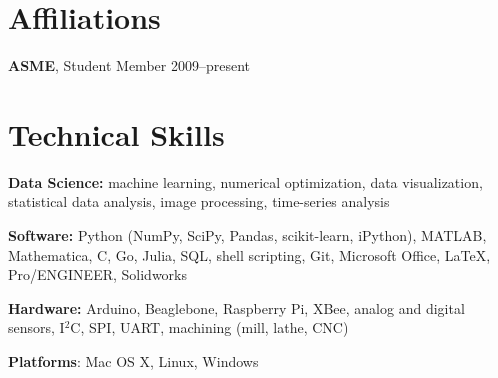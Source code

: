 \documentclass[]{res}
\begin{document}
\begin{resume}
\section{Affiliations}
\vspace{0.1in}

\textbf{ASME}, Student Member \hfill 2009--present


\section{Technical Skills}
\vspace{0.1in}

\textbf{Data Science:} machine learning, numerical optimization, data
visualization, statistical data analysis, image processing, time-series
analysis

\textbf{Software:} Python (NumPy, SciPy, Pandas, scikit-learn, iPython),
MATLAB, Mathematica, C, Go, Julia, SQL, shell scripting, Git, Microsoft Office,
LaTeX, Pro/ENGINEER, Solidworks

\textbf{Hardware:} Arduino, Beaglebone, Raspberry Pi, XBee, analog and digital
sensors, I$^2$C, SPI, UART, machining (mill, lathe, CNC)

\textbf{Platforms}: Mac OS X, Linux, Windows

\end{resume}
\end{document}
